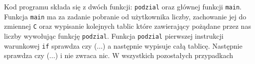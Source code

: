 \documentclass[UTF8]{article}
\begin{document}
Kod programu składa się z dwóch funkcji: \texttt{podzial} oraz głównej funkcji \texttt{main}. Funkcja \texttt{main} ma za zadanie pobranie od użytkownika liczby, zachowanie jej do zmiennej \texttt{C} oraz wypisanie kolejnych tablic które zawierający pożądane przez nas liczby wywołując funkcję \texttt{podzial}. Funkcja \texttt{podzial} pierwszej instrukcji warunkowej \texttt{if} sprawdza czy (...) a następnie wypisuje całą tablicę. Następnie sprawdza czy (...) i nie zwraca nic. W wszystkich pozostałych przypadkach 
\end{document}
